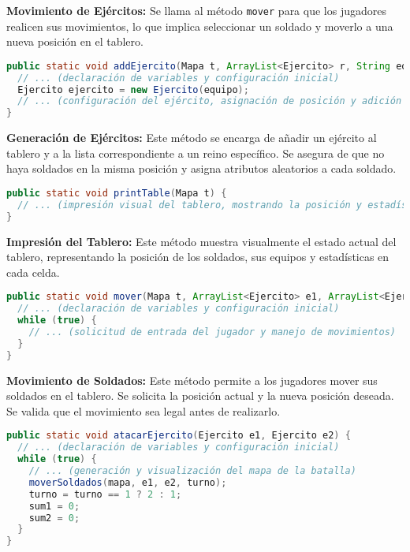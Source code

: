 \textbf{Movimiento de Ejércitos:} Se llama al método \texttt{mover} para que los jugadores realicen sus movimientos, lo que implica seleccionar un soldado y moverlo a una nueva posición en el tablero.

\begin{lstlisting}[language=Java]
public static void addEjercito(Mapa t, ArrayList<Ejercito> r, String equipo, int i, String reino) {
  // ... (declaración de variables y configuración inicial)
  Ejercito ejercito = new Ejercito(equipo);
  // ... (configuración del ejército, asignación de posición y adición al tablero y la lista del reino)
}
\end{lstlisting}

\textbf{Generación de Ejércitos:} Este método se encarga de añadir un ejército al tablero y a la lista correspondiente a un reino específico. Se asegura de que no haya soldados en la misma posición y asigna atributos aleatorios a cada soldado.

\begin{lstlisting}[language=Java]
public static void printTable(Mapa t) {
  // ... (impresión visual del tablero, mostrando la posición y estadísticas de los soldados)
}
\end{lstlisting}

\textbf{Impresión del Tablero:} Este método muestra visualmente el estado actual del tablero, representando la posición de los soldados, sus equipos y estadísticas en cada celda.

\begin{lstlisting}[language=Java]
public static void mover(Mapa t, ArrayList<Ejercito> e1, ArrayList<Ejercito> e2, int turno) {
  // ... (declaración de variables y configuración inicial)
  while (true) {
    // ... (solicitud de entrada del jugador y manejo de movimientos)
  }
}
\end{lstlisting}

\textbf{Movimiento de Soldados:} Este método permite a los jugadores mover sus soldados en el tablero. Se solicita la posición actual y la nueva posición deseada. Se valida que el movimiento sea legal antes de realizarlo.

\begin{lstlisting}[language=Java]
public static void atacarEjercito(Ejercito e1, Ejercito e2) {
  // ... (declaración de variables y configuración inicial)
  while (true) {
    // ... (generación y visualización del mapa de la batalla)
    moverSoldados(mapa, e1, e2, turno);
    turno = turno == 1 ? 2 : 1;
    sum1 = 0;
    sum2 = 0;
  }
}
\end{lstlisting}

